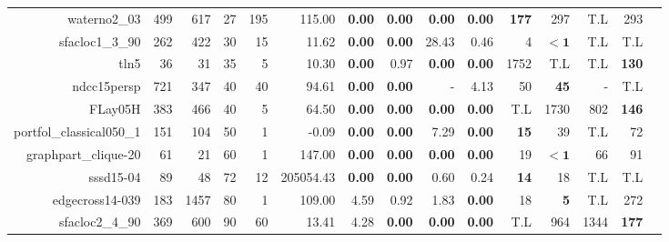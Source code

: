 \begin{table*}[t]
\begin{tabular}{|r|r|r|r|r||r||r|r|r|r||r|r|r|r|r|}
                     waterno2\_03 &          499 &          617 &          27 &         195 &            115.00 & \textbf{0.00} &\textbf{0.00} & \textbf{0.00} & \textbf{0.00} & \textbf{177} &                297 &          T.L &          293 \\ 
                  sfacloc1\_3\_90 &          262 &          422 &          30 &          15 &             11.62 & \textbf{0.00} &\textbf{0.00} &         28.43 &          0.46 &            4 &         $\bm{< 1}$ &          T.L &          T.L \\ 
                             tln5 &           36 &           31 &          35 &           5 &             10.30 & \textbf{0.00} &         0.97 & \textbf{0.00} & \textbf{0.00} &         1752 &                T.L &          T.L & \textbf{130} \\ 
                      ndcc15persp &          721 &          347 &          40 &          40 &             94.61 & \textbf{0.00} &\textbf{0.00} &             - &          4.13 &           50 &        \textbf{45} &            - &          T.L \\ 
                          FLay05H &          383 &          466 &          40 &           5 &             64.50 & \textbf{0.00} &\textbf{0.00} & \textbf{0.00} & \textbf{0.00} &          T.L &               1730 &          802 & \textbf{146} \\ 
         portfol\_classical050\_1 &          151 &          104 &          50 &           1 &             -0.09 & \textbf{0.00} &\textbf{0.00} &          7.29 & \textbf{0.00} &  \textbf{15} &                 39 &          T.L &           72 \\ 
             graphpart\_clique-20 &           61 &           21 &          60 &           1 &            147.00 & \textbf{0.00} &\textbf{0.00} & \textbf{0.00} & \textbf{0.00} &           19 &         $\bm{< 1}$ &           66 &           91 \\ 
                        sssd15-04 &           89 &           48 &          72 &          12 &         205054.43 & \textbf{0.00} &\textbf{0.00} &          0.60 &          0.24 &  \textbf{14} &                 18 &          T.L &          T.L \\ 
                  edgecross14-039 &          183 &         1457 &          80 &           1 &            109.00 &          4.59 &         0.92 &          1.83 & \textbf{0.00} &           18 &         \textbf{5} &          T.L &          272 \\ 
                  sfacloc2\_4\_90 &          369 &          600 &          90 &          60 &             13.41 &          4.28 &\textbf{0.00} & \textbf{0.00} & \textbf{0.00} &          T.L &                964 &         1344 & \textbf{177} \\ 

\end{tabular}
\end{table*}
